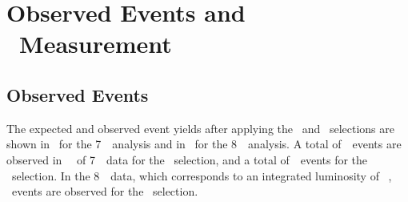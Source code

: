\graphicspath{{Chapters/CrossSection/Figures/}}
\chapter{Observed Events and \CX\ Measurement}
\label{chap:CrossSection}

\section{Observed Events}

The expected and observed event yields after applying the \ZZ\ and \ZZs\ selections are shown
in~ for the 7~\tev\ analysis and
in~ for the 8~\tev\ analysis. 
A total
of~\ZZSevenTeVNObsZZLLLL\ events
are observed in \LumiPassGRLTwentyEleven~\ifb\ of 7~\tev\ data for the \ZZ\
selection, and a total of~\ZZSevenTeVNObsZZsLLLL\ events for the \ZZs\ selection. In the 8~\tev\ data, which corresponds to an integrated luminosity of
\LumiPassGRLTwentyTwelve~\ifb, \ZZEightTeVNObsZZLLLL\ events are observed for
the \ZZ\ selection.

